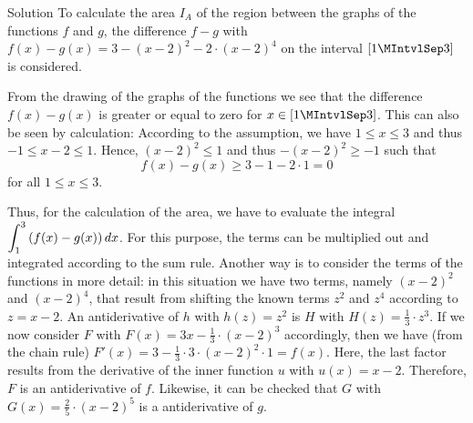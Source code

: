 \begin{MExercises}
\begin{MExercise}
\begin{MHint}{Solution}
To calculate the area $I_A$ of the region between the graphs of the functions 
$f$ and $g$, the difference $f - g$ with $f(x) - g(x) = 3 - (x - 2)^2 - 2 \cdot ( x - 2)^4$
on the interval $[1\MIntvlSep  3]$ is considered.

\begin{center}
\MTikzAuto{%
\ifttm\else\begin{small}\fi
\begin{tikzpicture}[line width=1.5pt,scale=1.0,
declare function={
  u1 = 1;
  u2 = 3;
  fkt1(\x) = 3 - ((\x - 2) * (\x - 2)); %
  fkt2(\x) = 2 * pow({\x - 2}, 4); %
}
] %
\draw[->] (-0.5, 0) -- (3.5, 0) node[below left]{$x$}; %
\draw[->] (0, -0.5) -- (0, 3.5) node[below left]{$y$}; %
\foreach \x in {1, 2, 3} \draw (\x, 0) -- ++(0, -0.1) %
 node[below] {$\x$}; 
\foreach \y in {1, 2, 3} \draw (0, \y) -- ++(-0.1, 0) %
 node[left] {$\y$};
\node[below left] at (0, 0) {$0$};
\draw[domain=u1:u2,samples=120,color=\jccolorfkt, fill=\jccolorfktarea] %
 plot (\x, {fkt1(\x)});
\draw[domain=u1:u2,samples=120,color=blue, fill=\jccolorfktarea] %
 plot (\x, {fkt2(\x)+0.014});
\node[right] at (2.75, {fkt1(2.7)}) {$f(x)$};
\node[right] at (2.75, {fkt2(2.7)}) {$g(x)$};
%
\end{tikzpicture}
\ifttm\else\end{small}\fi
}
\end{center}
From the drawing of the graphs of the functions we see that the difference 
$f(x) - g(x)$ is greater or equal to zero for $x \in [1\MIntvlSep  3]$. This can also be seen 
by calculation: According to the assumption, we have $1 \leq x \leq 3$ and thus $-1 \leq x - 2 \leq 1$. 
Hence, $(x - 2)^2 \leq 1$ and thus $-(x - 2)^2 \geq -1$ such that 
\[
f(x) - g(x) \geq 3 - 1 - 2 \cdot 1 = 0 %
\]
for all $1 \leq x \leq 3$. 

Thus, for the calculation of the area, we have to evaluate the integral 
$\displaystyle \int_1^3 \left(f(x) - g(x)\right) d x$. For this purpose, 
the terms can be multiplied out and integrated according to the sum rule. 
Another way is to consider the terms of the functions in more detail:
in this situation we have two terms, namely $(x - 2)^2$
and $(x - 2)^4$, that result from shifting the known terms $z^2$
and $z^4$ according to $z = x - 2$. An antiderivative of $h$ with $h(z) = z^2$
is $H$ with $H(z) = \frac{1}{3} \cdot z^3$. If we now consider $F$ with 
$F(x) = 3 x - \frac{1}{3} \cdot (x - 2)^3$ accordingly, then we have (from the 
chain rule) $F'(x) = 3 - \frac{1}{3} \cdot 3 \cdot (x - 2)^2 \cdot 1 = f(x)$. Here, 
the last factor results from the derivative of the inner function $u$ with 
$u(x) = x - 2$. Therefore, $F$ is an antiderivative of $f$. Likewise, 
it can be checked that $G$ with $G(x) = \frac{2}{5} \cdot (x - 2)^5$ is a 
antiderivative of $g$.


\end{MHint}
\end{MExercise}
\end{MExercises}

